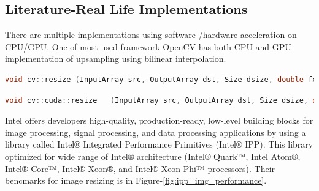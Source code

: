 \documentclass[]{article}
\begin{document}
	\subsection{Literature-Real Life Implementations}	
		\justifying There are multiple implementations using software /hardware acceleration on CPU/GPU. One of most used framework OpenCV has both CPU and GPU implementation of upsampling using bilinear interpolation.
		\vspace{1 cm}
		\begin{lstlisting}[language=C, caption={OpenCV Prototype of Bilinear Upsampling Function on CPU},label={lst:opencvcpu}]
void cv::resize (InputArray src, OutputArray dst, Size dsize, double fx=0, double fy=0, int interpolation=INTER_LINEAR		)
		\end{lstlisting} 
		\begin{lstlisting}[language=C,caption={OpenCV Prototype of Bilinear Upsampling Function on GPU}]
void cv::cuda::resize	(InputArray src, OutputArray dst, Size dsize, double fx = 0, double fy = 0, int interpolation = INTER_LINEAR, Stream &stream=Stream::Null())	
		\end{lstlisting}
		\vspace{1 cm}
		
		\justifying Intel offers developers high-quality, production-ready, low-level building blocks for image processing, signal processing, and data processing  applications by using a library called Intel® Integrated Performance Primitives (Intel® IPP). This library optimized for  wide range of Intel® architecture (Intel® Quark™, Intel Atom®, Intel® Core™, Intel® Xeon®, and Intel® Xeon Phi™ processors). Their bencmarks for image resizing is in Figure-\ref{fig:ipp_img_performance}. 
\end{document}
